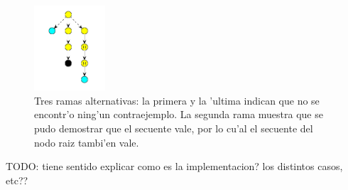 \begin{figure}[H]
	\includegraphics[width=100px]{img/ramas_alternativas.png}
	\centering
	\caption{Tres ramas alternativas: la primera y la 'ultima indican que no se encontr'o ning'un contraejemplo. La segunda rama muestra que se pudo demostrar que el secuente vale, por lo cu'al el secuente del nodo raiz tambi'en vale.}
\end{figure}

TODO: tiene sentido explicar como es la implementacion? los distintos casos, etc??